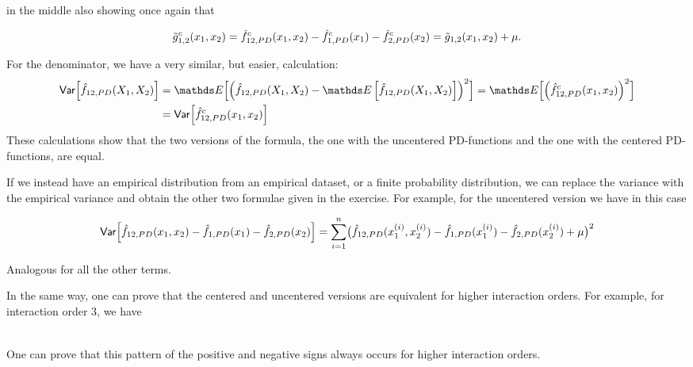 {\begin{enumerate}[a)]
in the middle also showing once again that

$$
\tilde{g}^c_{1,2}(x_1, x_2)
= \hat{f}^c_{12,PD}(x_1, x_2) - \hat{f}^c_{1,PD}(x_1) - \hat{f}^c_{2,PD}(x_2)
= \tilde{g}_{1,2}(x_1, x_2) + \mu.
$$

For the denominator, we have a very similar, but easier, calculation:
\begin{align*}
\var \Bigl[
    \fh_{12,PD}(X_1, X_2)
    \Bigr] 
= & \; \E \Bigl[ \left( \fh_{12,PD}(X_1, X_2) - \E \left[ \fh_{12,PD}(X_1, X_2) \right] \right)^2 \Bigr]
= \E \Bigl[ \left( \fh^c_{12,PD}(x_1, x_2) \right)^2 \Bigr] \\
= & \; \var \Bigl[ \fh^c_{12,PD}(x_1, x_2) \Bigr]
\end{align*}
These calculations show that the two versions of the formula, the one with the uncentered PD-functions and the one with the centered PD-functions, are equal.

If we instead have an empirical distribution from an empirical dataset, or a finite probability distribution, we can replace the variance with the empirical variance and obtain the other two formulae given in the exercise.
For example, for the uncentered version we have in this case

$$
\mathsf{Var} \Bigl[ \hat{f}_{12,PD}(x_1, x_2) - \hat{f}_{1,PD}(x_1) - \hat{f}_{2,PD}(x_2) \Bigr]
= \sum_{i = 1}^n \bigl(
    \hat{f}_{12,PD}(x_1^{(i)},x_2^{(i)})-
    \hat{f}_{1,PD}(x_1^{(i)})-
    \hat{f}_{2,PD}(x_2^{(i)})
    + \mu
\bigr)^2
$$

Analogous for all the other terms.

In the same way, one can prove that the centered and uncentered versions are equivalent for higher interaction orders.
For example, for interaction order 3, we have

\begin{align*}
\end{align*}

One can prove that this pattern of the positive and negative signs always occurs for higher interaction orders.

\end{enumerate}

}